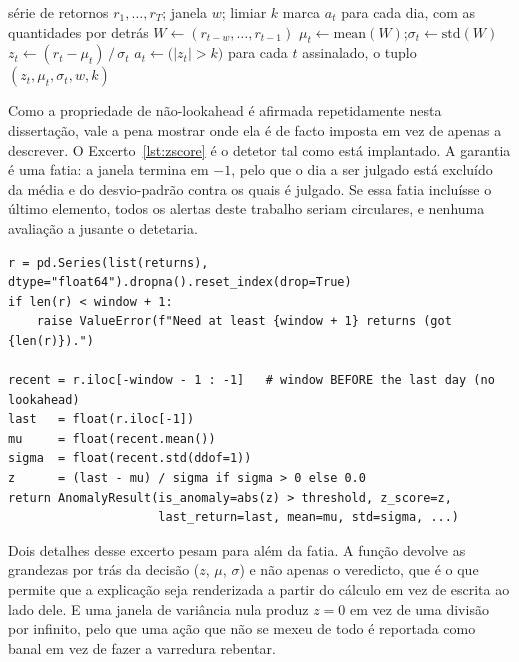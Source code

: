 \begin{algorithm}[ht]
\caption{Deteção de anomalias por \emph{z}-score deslizante (sem lookahead).}
\label{alg:zscore}
\begin{algorithmic}[1]
\Require série de retornos $r_1,\dots,r_T$; janela $w$; limiar $k$
\Ensure marca $a_t$ para cada dia, com as quantidades por detrás
  \State $W \gets (r_{t-w},\dots,r_{t-1})$ 
  \State $\mu_t \gets \mathrm{mean}(W)$;\quad $\sigma_t \gets \mathrm{std}(W)$
  \State $z_t \gets (r_t - \mu_t)\,/\,\sigma_t$
  \State $a_t \gets \big(|z_t| > k\big)$
\EndFor
\State \Return para cada $t$ assinalado, o tuplo $(z_t,\mu_t,\sigma_t,w,k)$ 
\end{algorithmic}
\end{algorithm}

Como a propriedade de não-lookahead é afirmada repetidamente nesta dissertação, vale a pena mostrar
onde ela é de facto imposta em vez de apenas a descrever. O Excerto~\ref{lst:zscore} é o detetor tal
como está implantado. A garantia é uma fatia: a janela termina em $-1$, pelo que o dia a ser julgado
está excluído da média e do desvio-padrão contra os quais é julgado. Se essa fatia incluísse o último
elemento, todos os alertas deste trabalho seriam circulares, e nenhuma avaliação a jusante o
detetaria.

\begin{lstlisting}[caption={O detetor \emph{z}-score. A janela que define ``normal'' pára um dia antes
do dia a ser julgado.}, label={lst:zscore}]
r = pd.Series(list(returns), dtype="float64").dropna().reset_index(drop=True)
if len(r) < window + 1:
    raise ValueError(f"Need at least {window + 1} returns (got {len(r)}).")

recent = r.iloc[-window - 1 : -1]   # window BEFORE the last day (no lookahead)
last   = float(r.iloc[-1])
mu     = float(recent.mean())
sigma  = float(recent.std(ddof=1))
z      = (last - mu) / sigma if sigma > 0 else 0.0
return AnomalyResult(is_anomaly=abs(z) > threshold, z_score=z,
                     last_return=last, mean=mu, std=sigma, ...)
\end{lstlisting}

Dois detalhes desse excerto pesam para além da fatia. A função devolve as grandezas por trás da
decisão ($z$, $\mu$, $\sigma$) e não apenas o veredicto, que é o que permite que a explicação seja
renderizada a partir do cálculo em vez de escrita ao lado dele. E uma janela de variância nula produz
$z = 0$ em vez de uma divisão por infinito, pelo que uma ação que não se mexeu de todo é reportada
como banal em vez de fazer a varredura rebentar.

